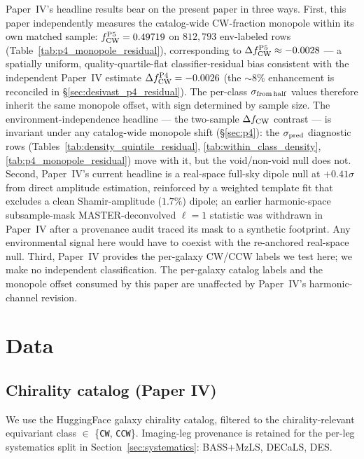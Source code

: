 \documentclass[aps,prd,twocolumn,superscriptaddress,showpacs,preprintnumbers,nofootinbib,longbibliography,floatfix]{revtex4-2}
\begin{document}
Paper~IV's headline results bear on the present paper in three ways.
First, this paper independently measures the catalog-wide CW-fraction
monopole within its own matched sample: $f_{\rm CW}^{\rm P5} =
0.49719$ on $812{,}793$ env-labeled rows
(Table~\ref{tab:p4_monopole_residual}), corresponding to
$\Delta f_{\rm CW}^{\rm P5} \approx -0.0028$ --- a spatially uniform,
quality-quartile-flat classifier-residual bias consistent with the
independent Paper~IV estimate $\Delta f_{\rm CW}^{\rm P4} = -0.0026$
(the ${\sim}8\%$ enhancement is reconciled in \S\ref{sec:desivast_p4_residual}).
The per-class $\sigma_{\rm from\,half}$ values therefore inherit the
same monopole offset, with sign determined by sample size. The
environment-independence headline --- the two-sample $\Delta f_{\rm CW}$
contrast --- is invariant under any catalog-wide monopole shift
(\S\ref{sec:p4}): the $\sigma_{\rm pred}$ diagnostic rows
(Tables~\ref{tab:density_quintile_residual},
\ref{tab:within_class_density}, \ref{tab:p4_monopole_residual}) move
with it, but the void/non-void null does not. Second,
Paper~IV's current headline is a real-space full-sky dipole
null at $+0.41\sigma$ from direct amplitude estimation,
reinforced by a weighted template fit that excludes a clean
Shamir-amplitude ($1.7\%$) dipole; an earlier harmonic-space
subsample-mask MASTER-deconvolved $\ell\!=\!1$ statistic was withdrawn
in Paper~IV after a provenance audit traced its mask to a
synthetic footprint. Any environmental signal
here would have to coexist with the re-anchored real-space null. Third,
Paper~IV provides
the per-galaxy CW/CCW labels we test here; we make no independent
classification. The per-galaxy catalog labels and the monopole offset
consumed by this paper are unaffected by Paper~IV's harmonic-channel
revision.

\section{Data}\label{sec:data}

\subsection{Chirality catalog (Paper IV)}

We use the HuggingFace galaxy chirality catalog,
filtered to the chirality-relevant equivariant class $\in$
\{\texttt{CW}, \texttt{CCW}\}. Imaging-leg provenance is retained for
the per-leg systematics split in Section~\ref{sec:systematics}:
BASS+MzLS, DECaLS, DES.
\end{document}
